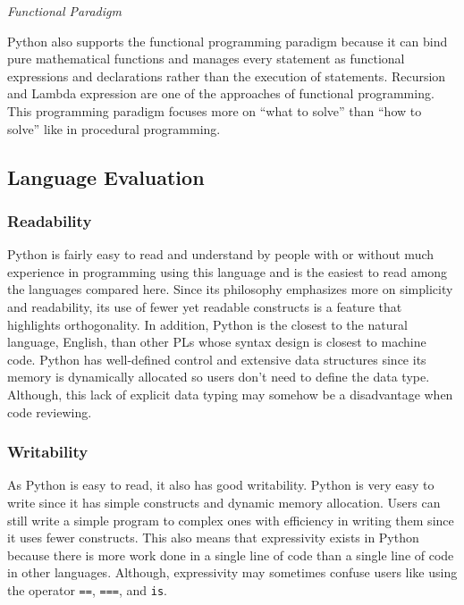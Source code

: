 \documentclass{article}
\begin{document}
\par
\noindent
\textit{Functional Paradigm}

\par
Python also supports the functional programming paradigm because it can bind pure mathematical functions and manages every statement as functional expressions and declarations rather than the execution of statements. Recursion and Lambda expression are one of the approaches of functional programming. This programming paradigm focuses more on “what to solve” than “how to solve” like in procedural programming.

\subsection*{Language Evaluation}

\subsubsection*{Readability}
\par
Python is fairly easy to read and understand by people with or without much experience in programming using this language and is the easiest to read among the languages compared here. Since its philosophy emphasizes more on simplicity and readability, its use of fewer yet readable constructs is a feature that highlights orthogonality. In addition, Python is the closest to the natural language, English, than other PLs whose syntax design is closest to machine code. Python has well-defined control and extensive data structures since its memory is dynamically allocated so users don't need to define the data type. Although, this lack of explicit data typing may somehow be a disadvantage when code reviewing.

\subsubsection*{Writability}
\par
As Python is easy to read, it also has good writability. Python is very easy to write since it has simple constructs and dynamic memory allocation. Users can still write a simple program to complex ones with efficiency in writing them since it uses fewer constructs. This also means that expressivity exists in Python because there is more work done in a single line of code than a single line of code in other languages. Although, expressivity may sometimes confuse users like using the operator \texttt{==}, \texttt{===}, and \texttt{is}.
\end{document}
